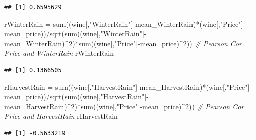 \documentclass[
]{article}
\newenvironment{Shaded}{\begin{snugshade}}{\end{snugshade}}
\newcommand{\CommentTok}[1]{\textcolor[rgb]{0.56,0.35,0.01}{\textit{#1}}}
\newcommand{\DecValTok}[1]{\textcolor[rgb]{0.00,0.00,0.81}{#1}}
\newcommand{\FunctionTok}[1]{\textcolor[rgb]{0.00,0.00,0.00}{#1}}
\newcommand{\NormalTok}[1]{#1}
\newcommand{\OtherTok}[1]{\textcolor[rgb]{0.56,0.35,0.01}{#1}}
\newcommand{\SpecialCharTok}[1]{\textcolor[rgb]{0.00,0.00,0.00}{#1}}
\newcommand{\StringTok}[1]{\textcolor[rgb]{0.31,0.60,0.02}{#1}}
\begin{document}
\begin{verbatim}
## [1] 0.6595629
\end{verbatim}

\begin{Shaded}
\begin{Highlighting}[]
\NormalTok{rWinterRain }\OtherTok{=} \FunctionTok{sum}\NormalTok{((wine[,}\StringTok{"WinterRain"}\NormalTok{]}\SpecialCharTok{{-}}\NormalTok{mean\_WinterRain)}\SpecialCharTok{*}\NormalTok{(wine[,}\StringTok{"Price"}\NormalTok{]}\SpecialCharTok{{-}}\NormalTok{mean\_price))}\SpecialCharTok{/}\FunctionTok{sqrt}\NormalTok{(}\FunctionTok{sum}\NormalTok{((wine[,}\StringTok{"WinterRain"}\NormalTok{]}\SpecialCharTok{{-}}\NormalTok{mean\_WinterRain)}\SpecialCharTok{\^{}}\DecValTok{2}\NormalTok{)}\SpecialCharTok{*}\FunctionTok{sum}\NormalTok{((wine[,}\StringTok{"Price"}\NormalTok{]}\SpecialCharTok{{-}}\NormalTok{mean\_price)}\SpecialCharTok{\^{}}\DecValTok{2}\NormalTok{)) }\CommentTok{\# Pearson Cor Price and WinterRain}
\NormalTok{rWinterRain}
\end{Highlighting}
\end{Shaded}

\begin{verbatim}
## [1] 0.1366505
\end{verbatim}

\begin{Shaded}
\begin{Highlighting}[]
\NormalTok{rHarvestRain }\OtherTok{=} \FunctionTok{sum}\NormalTok{((wine[,}\StringTok{"HarvestRain"}\NormalTok{]}\SpecialCharTok{{-}}\NormalTok{mean\_HarvestRain)}\SpecialCharTok{*}\NormalTok{(wine[,}\StringTok{"Price"}\NormalTok{]}\SpecialCharTok{{-}}\NormalTok{mean\_price))}\SpecialCharTok{/}\FunctionTok{sqrt}\NormalTok{(}\FunctionTok{sum}\NormalTok{((wine[,}\StringTok{"HarvestRain"}\NormalTok{]}\SpecialCharTok{{-}}\NormalTok{mean\_HarvestRain)}\SpecialCharTok{\^{}}\DecValTok{2}\NormalTok{)}\SpecialCharTok{*}\FunctionTok{sum}\NormalTok{((wine[,}\StringTok{"Price"}\NormalTok{]}\SpecialCharTok{{-}}\NormalTok{mean\_price)}\SpecialCharTok{\^{}}\DecValTok{2}\NormalTok{)) }\CommentTok{\# Pearson Cor Price and HarvestRain}
\NormalTok{rHarvestRain}
\end{Highlighting}
\end{Shaded}

\begin{verbatim}
## [1] -0.5633219
\end{verbatim}
\end{document}
